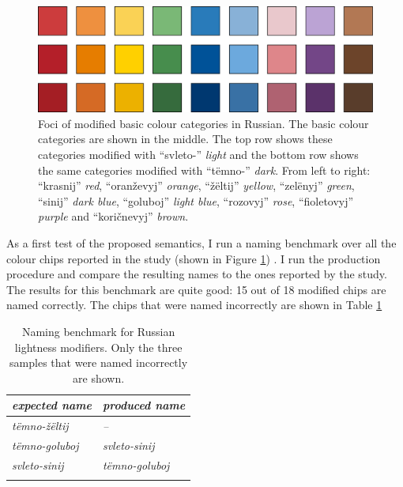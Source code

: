 \begin{figure}[htpb]
  \centering
  \includegraphics[width=.9\textwidth]{./achromatic/figures/russian-modified-foci.pdf}
  \caption[Foci of modified basic colour categories in Russian]{Foci
    of modified basic colour categories in Russian. The basic colour
    categories are shown in the middle. The top row shows these
    categories modified with ``svleto-'' \emph{light} and the bottom
    row shows the same categories modified with ``t\"emno-''
    \emph{dark}.  From left to right: ``krasnij'' \emph{red}, ``oran\v
    zevyj'' \emph{orange}, ``\v z\"eltij'' \emph{yellow},
    ``zel\"enyj'' \emph{green}, ``sinij'' \emph{dark blue},
    ``goluboj'' \emph{light blue}, ``rozovyj'' \emph{rose},
    ``fioletovyj'' \emph{purple} and ``kori\v cnevyj'' \emph{brown}.}
  \label{f:ams-russian-basic-modifiers}
\end{figure}

As a first test of the proposed semantics, I run a naming benchmark
over all the colour chips reported in the study (shown in Figure
\ref{f:ams-russian-basic-modifiers})
. 
I run the production
procedure and compare the resulting names to the ones reported by the
study. The results for this benchmark are quite good: 15 out of 18
modified chips are named correctly. The chips that were named
incorrectly are shown in Table \ref{t:ams-russian-naming-benchmark}

\begin{table}[htpb]
  \centering
  \begin{tabular}{>{\itshape}l>{\itshape}l}
  \lsptoprule
    \normalfont expected name & \normalfont produced name \\
    \midrule
    t\"emno-\v z\"eltij & \normalfont -- \\
    t\"emno-goluboj & svleto-sinij \\
    svleto-sinij & t\"emno-goluboj\\
    \lspbottomrule
  \end{tabular}
  \caption[Naming benchmark for Russian lightness modifiers]{Naming benchmark for Russian lightness modifiers. Only the three samples that were named incorrectly are shown.}
  \label{t:ams-russian-naming-benchmark}
\end{table}

